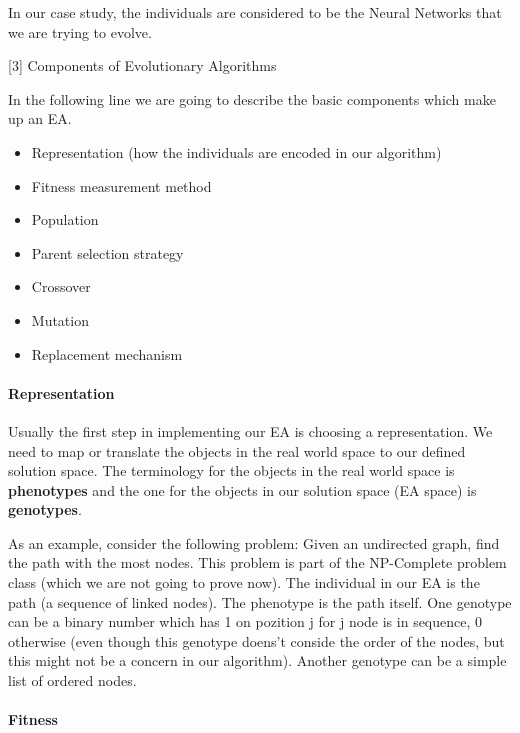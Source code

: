 \documentclass[11pt]{article}
\providecommand{\tightlist}{%
      \setlength{\itemsep}{0pt}\setlength{\parskip}{0pt}}
\begin{document}
In our case study, the individuals are considered to be the Neural
Networks that we are trying to evolve.

    {[}3{]} Components of Evolutionary Algorithms

In the following line we are going to describe the basic components
which make up an EA.

\begin{itemize}
\tightlist
\item
  Representation (how the individuals are encoded in our algorithm)
\item
  Fitness measurement method
\item
  Population
\item
  Parent selection strategy
\item
  Crossover
\item
  Mutation
\item
  Replacement mechanism
\end{itemize}

\hypertarget{representation}{%
\paragraph{Representation}\label{representation}}

Usually the first step in implementing our EA is choosing a
representation. We need to map or translate the objects in the real
world space to our defined solution space. The terminology for the
objects in the real world space is \textbf{phenotypes} and the one for
the objects in our solution space (EA space) is \textbf{genotypes}.

As an example, consider the following problem: Given an undirected
graph, find the path with the most nodes. This problem is part of the
NP-Complete problem class (which we are not going to prove now). The
individual in our EA is the path (a sequence of linked nodes). The
phenotype is the path itself. One genotype can be a binary number which
has 1 on pozition j for j node is in sequence, 0 otherwise (even though
this genotype doens't conside the order of the nodes, but this might not
be a concern in our algorithm). Another genotype can be a simple list of
ordered nodes.

\hypertarget{fitness}{%
\paragraph{Fitness}\label{fitness}}
\end{document}
